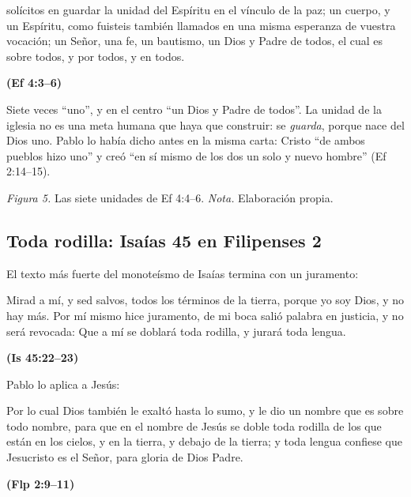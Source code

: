 \documentclass[11pt,letterpaper]{article}
\newcommand{\fuente}[1]{\par\hfill{\upshape\bfseries\small\textcolor{azul}{#1}}}
\begin{document}
\begin{cita}solícitos en guardar la unidad del Espíritu en el vínculo de la paz; un cuerpo, y un Espíritu, como fuisteis también llamados en una misma esperanza de vuestra vocación; un Señor, una fe, un bautismo, un Dios y Padre de todos, el cual es sobre todos, y por todos, y en todos.\fuente{(Ef 4:3--6)}\end{cita}

Siete veces ``uno'', y en el centro ``un Dios y Padre de todos''. La unidad de la iglesia no es una meta humana que haya que construir: se \emph{guarda}, porque nace del Dios uno. Pablo lo había dicho antes en la misma carta: Cristo ``de ambos pueblos hizo uno'' y creó ``en sí mismo de los dos un solo y nuevo hombre'' (Ef 2:14--15).

\begin{center}
\par
{\footnotesize\color{gris}\textit{Figura 5.} Las siete unidades de Ef 4:4--6. \textit{Nota.} Elaboración propia.}
\end{center}

\subsection{Toda rodilla: Isaías 45 en Filipenses 2}
El texto más fuerte del monoteísmo de Isaías termina con un juramento:

\begin{cita}Mirad a mí, y sed salvos, todos los términos de la tierra, porque yo soy Dios, y no hay más. Por mí mismo hice juramento, de mi boca salió palabra en justicia, y no será revocada: Que a mí se doblará toda rodilla, y jurará toda lengua.\fuente{(Is 45:22--23)}\end{cita}

Pablo lo aplica a Jesús:

\begin{cita}Por lo cual Dios también le exaltó hasta lo sumo, y le dio un nombre que es sobre todo nombre, para que en el nombre de Jesús se doble toda rodilla de los que están en los cielos, y en la tierra, y debajo de la tierra; y toda lengua confiese que Jesucristo es el Señor, para gloria de Dios Padre.\fuente{(Flp 2:9--11)}\end{cita}
\end{document}
